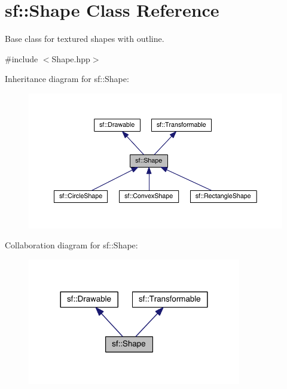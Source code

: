 \hypertarget{classsf_1_1_shape}{\section{sf\-:\-:Shape Class Reference}
\label{classsf_1_1_shape}
}


Base class for textured shapes with outline.  




{\ttfamily \#include $<$Shape.\-hpp$>$}



Inheritance diagram for sf\-:\-:Shape\-:
\nopagebreak
\begin{figure}[H]
\begin{center}
\leavevmode
\includegraphics[width=350pt]{classsf_1_1_shape__inherit__graph}
\end{center}
\end{figure}


Collaboration diagram for sf\-:\-:Shape\-:
\nopagebreak
\begin{figure}[H]
\begin{center}
\leavevmode
\includegraphics[width=264pt]{classsf_1_1_shape__coll__graph}
\end{center}
\end{figure}
